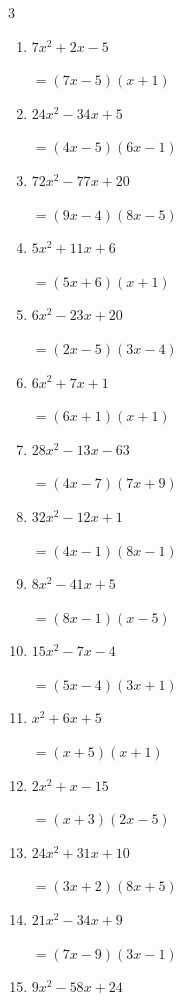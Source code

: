 \begin{multicols}{3}
\begin{enumerate}
\columnbreak %

\resetques

  \item $7x^{2}+2x-5$

        $=(7x-5)(x+1)$

  \item $24x^{2}-34x+5$

        $=(4x-5)(6x-1)$

  \item $72x^{2}-77x+20$

        $=(9x-4)(8x-5)$

  \item $5x^{2}+11x+6$

        $=(5x+6)(x+1)$

  \item $6x^{2}-23x+20$

        $=(2x-5)(3x-4)$

  \item $6x^{2}+7x+1$

        $=(6x+1)(x+1)$

  \item $28x^{2}-13x-63$

        $=(4x-7)(7x+9)$

  \item $32x^{2}-12x+1$

        $=(4x-1)(8x-1)$

  \item $8x^{2}-41x+5$

        $=(8x-1)(x-5)$

  \item $15x^{2}-7x-4$

        $=(5x-4)(3x+1)$

\columnbreak %

  \item $x^{2}+6x+5$

        $=(x+5)(x+1)$

  \item $2x^{2}+x-15$

        $=(x+3)(2x-5)$

  \item $24x^{2}+31x+10$

        $=(3x+2)(8x+5)$

  \item $21x^{2}-34x+9$

        $=(7x-9)(3x-1)$

  \item $9x^{2}-58x+24$


\end{enumerate}
\end{multicols}
